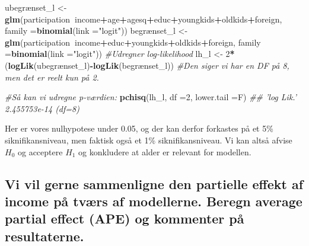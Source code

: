 \documentclass[
  10pt,
]{article}
\newenvironment{Shaded}{\begin{snugshade}}{\end{snugshade}}
\newcommand{\CommentTok}[1]{\textcolor[rgb]{0.56,0.35,0.01}{\textit{#1}}}
\newcommand{\DataTypeTok}[1]{\textcolor[rgb]{0.13,0.29,0.53}{#1}}
\newcommand{\DecValTok}[1]{\textcolor[rgb]{0.00,0.00,0.81}{#1}}
\newcommand{\KeywordTok}[1]{\textcolor[rgb]{0.13,0.29,0.53}{\textbf{#1}}}
\newcommand{\NormalTok}[1]{#1}
\newcommand{\OperatorTok}[1]{\textcolor[rgb]{0.81,0.36,0.00}{\textbf{#1}}}
\newcommand{\StringTok}[1]{\textcolor[rgb]{0.31,0.60,0.02}{#1}}
\begin{document}
\begin{Shaded}
\begin{Highlighting}[]
\NormalTok{ubegrænset_l <-}\StringTok{ }\KeywordTok{glm}\NormalTok{(participation}\OperatorTok{~}\NormalTok{income}\OperatorTok{+}\NormalTok{age}\OperatorTok{+}\NormalTok{agesq}\OperatorTok{+}\NormalTok{educ}\OperatorTok{+}\NormalTok{youngkids}\OperatorTok{+}\NormalTok{oldkids}\OperatorTok{+}\NormalTok{foreign,}
                    \DataTypeTok{family =}\KeywordTok{binomial}\NormalTok{(}\DataTypeTok{link =}\StringTok{"logit"}\NormalTok{))}
\NormalTok{begrænset_l <-}\StringTok{ }\KeywordTok{glm}\NormalTok{(participation}\OperatorTok{~}\NormalTok{income}\OperatorTok{+}\NormalTok{educ}\OperatorTok{+}\NormalTok{youngkids}\OperatorTok{+}\NormalTok{oldkids}\OperatorTok{+}\NormalTok{foreign,}
                   \DataTypeTok{family =}\KeywordTok{binomial}\NormalTok{(}\DataTypeTok{link =}\StringTok{"logit"}\NormalTok{))}
\CommentTok{#Udregner log-likelihood}
\NormalTok{lh_l <-}\StringTok{ }\DecValTok{2}\OperatorTok{*}\NormalTok{(}\KeywordTok{logLik}\NormalTok{(ubegrænset_l)}\OperatorTok{-}\KeywordTok{logLik}\NormalTok{(begrænset_l))}
\CommentTok{#Den siger vi har en DF på 8, men det er reelt kun på 2. }

\CommentTok{#Så kan vi udregne p-værdien: }
\KeywordTok{pchisq}\NormalTok{(lh_l, }\DataTypeTok{df =}\DecValTok{2}\NormalTok{, }\DataTypeTok{lower.tail =}\NormalTok{F)}
\CommentTok{## 'log Lik.' 2.455753e-14 (df=8)}
\end{Highlighting}
\end{Shaded}

Her er vores nulhypotese under 0.05, og der kan derfor forkastes på et
5\% siknifikansniveau, men faktisk også et 1\% siknifikansniveau. Vi kan
altså afvise \(H_0\) og acceptere \(H_1\) og konkludere at alder er
relevant for modellen.

\hypertarget{vi-vil-gerne-sammenligne-den-partielle-effekt-af-income-puxe5-tvuxe6rs-af-modellerne.-beregn-average-partial-effect-ape-og-kommenter-puxe5-resultaterne.}{%
\subsection{Vi vil gerne sammenligne den partielle effekt af income på
tværs af modellerne. Beregn average partial effect (APE) og kommenter på
resultaterne.}\label{vi-vil-gerne-sammenligne-den-partielle-effekt-af-income-puxe5-tvuxe6rs-af-modellerne.-beregn-average-partial-effect-ape-og-kommenter-puxe5-resultaterne.}}
\end{document}
